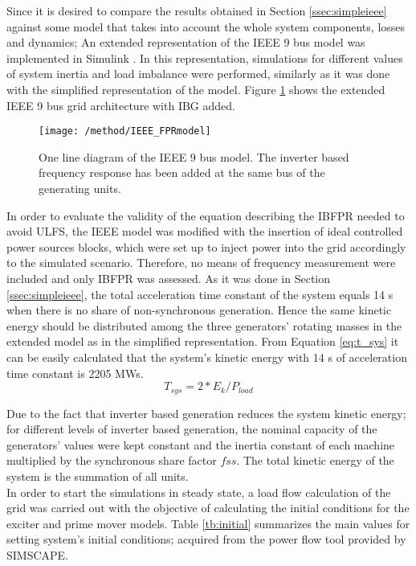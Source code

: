 Since it is desired to compare the results obtained in Section \ref{ssec:simpleieee} against some model that takes into account the whole system components, losses and dynamics; An  extended representation of the IEEE 9 bus model was implemented in Simulink \cite{delavari2018simscape}. In this representation, simulations for different values of system inertia and load imbalance were performed, similarly as it was done with the simplified representation of the model. Figure \ref{fig:ieeeext} shows the extended IEEE 9 bus grid architecture with IBG added.\\
\begin{figure}[h]
	\centering
	\texttt{[image: /method/IEEE\_FPRmodel]}
	\caption{One line diagram of the IEEE 9 bus model. The inverter based frequency response has been added at the same bus of the generating units.}
	\label{fig:ieeeext}
\end{figure}
In order to evaluate the validity of the equation describing the IBFPR needed to avoid ULFS, the IEEE model was modified with the insertion of ideal controlled power sources blocks, which were set up to inject power into the grid accordingly to the simulated scenario. Therefore, no means of frequency measurement were included and only IBFPR was assessed.
As it was done in Section \ref{ssec:simpleieee}, the total acceleration time constant of the system equals 14 s when there is no share of non-synchronous generation. Hence the same kinetic energy should be distributed among the three generators' rotating masses in the extended model as in the simplified representation. From Equation \eqref{eq:t_sys} it can be easily calculated that the system's kinetic energy with 14 s of acceleration time constant is 2205 MWs.
\begin{equation}
	\label{eq:t_sys}
	T_{sys}=2*E_{k} /P_{load}
\end{equation}

Due to the fact that inverter based generation reduces the system kinetic energy; for different levels of inverter based generation, the nominal capacity of the generators' values were kept constant and the inertia constant of each machine multiplied by the synchronous share factor $ fss $. The total kinetic energy of the system is the summation of all units.\\
In order to start the simulations in steady state, a load flow calculation of the grid was carried out with the objective of calculating the initial conditions for the exciter and prime mover models.
Table \ref{tb:initial} summarizes the main values for setting system's initial conditions; acquired from the power flow tool provided by SIMSCAPE.


